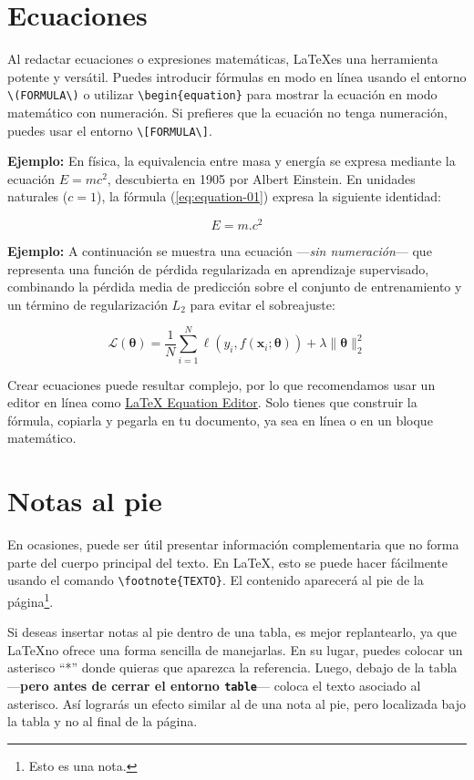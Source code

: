 \section{Ecuaciones}

Al redactar ecuaciones o expresiones matemáticas, \LaTeX es una herramienta potente y versátil. Puedes introducir fórmulas en modo en línea usando el entorno \verb|\(FORMULA\)| o utilizar \verb|\begin{equation}| para mostrar la ecuación en modo matemático con numeración. Si prefieres que la ecuación no tenga numeración, puedes usar el entorno \verb|\[FORMULA\]|.

\vspace{.875em}
\textbf{Ejemplo:} En física, la equivalencia entre masa y energía se expresa mediante la ecuación \(E=mc^2\), descubierta en 1905 por Albert Einstein. En unidades naturales ($c = 1$), la fórmula (\ref{eq:equation-01}) expresa la siguiente identidad:

\begin{equation}
\label{eq:equation-01}
E = m.c^2
\end{equation}

\textbf{Ejemplo:} A continuación se muestra una ecuación —\textit{sin numeración}— que representa una función de pérdida regularizada en aprendizaje supervisado, combinando la pérdida media de predicción sobre el conjunto de entrenamiento y un término de regularización $L_2$ para evitar el sobreajuste:

\[
\mathcal{L}(\boldsymbol{\theta}) = \frac{1}{N} \sum_{i=1}^{N} \ell(y_i, f(\mathbf{x}_i; \boldsymbol{\theta})) + \lambda \|\boldsymbol{\theta}\|_2^2
\]

Crear ecuaciones puede resultar complejo, por lo que recomendamos usar un editor en línea como \href{https://latexeditor.lagrida.com/}{LaTeX Equation Editor}. Solo tienes que construir la fórmula, copiarla y pegarla en tu documento, ya sea en línea o en un bloque matemático.

\section{Notas al pie}

En ocasiones, puede ser útil presentar información complementaria que no forma parte del cuerpo principal del texto. En \LaTeX, esto se puede hacer fácilmente usando el comando \verb|\footnote{TEXTO}|. El contenido aparecerá al pie de la página\footnote{Esto es una nota.}.

Si deseas insertar notas al pie dentro de una tabla, es mejor replantearlo, ya que \LaTeX no ofrece una forma sencilla de manejarlas. En su lugar, puedes colocar un asterisco “*” donde quieras que aparezca la referencia. Luego, debajo de la tabla —\textbf{pero antes de cerrar el entorno \texttt{table}}— coloca el texto asociado al asterisco. Así lograrás un efecto similar al de una nota al pie, pero localizada bajo la tabla y no al final de la página.
